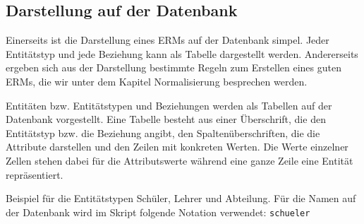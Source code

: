 \subsection[Darstellung auf der DB]{Darstellung auf der Datenbank}
Einerseits ist die Darstellung eines ERMs auf der Datenbank simpel. Jeder Entitätstyp und jede Beziehung kann als Tabelle dargestellt werden. Andererseits ergeben sich aus der Darstellung bestimmte Regeln zum Erstellen eines guten ERMs, die wir unter dem Kapitel Normalisierung besprechen werden.

\begin{tcolorbox}[title=Entitäten/-typen und Beziehungen auf der Datenbank]
	Entitäten bzw. Entitätstypen und Beziehungen werden als Tabellen auf der Datenbank vorgestellt. Eine Tabelle besteht aus einer Überschrift, die den Entitätstyp bzw. die Beziehung angibt, den Spaltenüberschriften, die die Attribute darstellen und den Zeilen mit konkreten Werten. Die Werte einzelner Zellen stehen dabei für die Attributswerte während eine ganze Zeile eine Entität repräsentiert.
\end{tcolorbox}
Beispiel für die Entitätstypen Schüler, Lehrer und Abteilung. Für die Namen auf der Datenbank wird im Skript folgende Notation verwendet: \lstinline!schueler!

\bigskip

